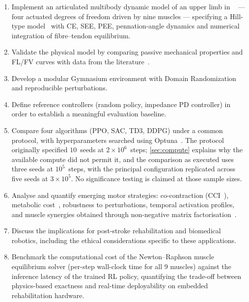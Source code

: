 \begin{enumerate}
  \item Implement an articulated multibody dynamic model of an upper limb in
        \MuJoCo{}~\parencite{Todorov2012} --- four actuated degrees of freedom
        driven by nine muscles --- specifying a Hill-type
        model~\parencite{Hill1938} with CE, SEE, PEE, pennation-angle dynamics
        and numerical integration of fibre--tendon equilibrium.
  \item Validate the physical model by comparing passive mechanical properties and
        FL/FV curves with data from the literature~\parencite{Holzbaur2005, Winter2009, Gordon1966}.
  \item Develop a modular Gymnasium environment with Domain Randomization and
        reproducible perturbations.
  \item Define reference controllers (random policy, impedance PD controller) in
        order to establish a meaningful evaluation baseline.
  \item Compare four \DRL{} algorithms (PPO, SAC, TD3, DDPG) under a common
        protocol, with hyperparameters searched using
        Optuna~\parencite{Akiba2019}. The protocol originally specified
        $10$~seeds at $2{\times}10^6$~steps; \cref{sec:compute} explains why the
        available compute did not permit it, and the comparison as executed uses
        three seeds at $10^5$~steps, with the principal configuration replicated
        across five seeds at $3{\times}10^5$. No significance testing is claimed
        at those sample sizes.
  \item Analyse and quantify emerging motor strategies: co-contraction
        (CCI~\parencite{Falconer1985}), metabolic cost~\parencite{Bhargava2004},
        robustness to perturbations, temporal activation profiles, and muscle
        synergies obtained through non-negative matrix factorisation~\parencite{dAvella2003}.
  \item Discuss the implications for post-stroke rehabilitation and biomedical
        robotics, including the ethical considerations specific to these
        applications.
  \item Benchmark the computational cost of the Newton--Raphson muscle
        equilibrium solver (per-step wall-clock time for all 9 muscles) against
        the inference latency of the trained RL policy, quantifying the
        trade-off between physics-based exactness and real-time deployability on
        embedded rehabilitation hardware.
\end{enumerate}


